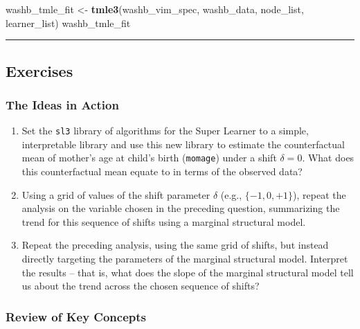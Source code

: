 \documentclass[12pt, krantz2,]{krantz}
\newenvironment{Shaded}{\begin{snugshade}}{\end{snugshade}}
\newcommand{\KeywordTok}[1]{\textcolor[rgb]{0.27,0.27,0.27}{\textbf{#1}}}
\newcommand{\NormalTok}[1]{#1}
\newcommand{\StringTok}[1]{\textcolor[rgb]{0.5,0.5,0.5}{#1}}
\theoremstyle{definition}
\theoremstyle{definition}
\theoremstyle{definition}
\newcommand{\1}{\mathbbm{1}}
\begin{document}
\begin{Shaded}
\begin{Highlighting}[]
\NormalTok{washb_tmle_fit <-}\StringTok{ }\KeywordTok{tmle3}\NormalTok{(washb_vim_spec, washb_data, node_list, learner_list)}
\NormalTok{washb_tmle_fit}
\end{Highlighting}
\end{Shaded}

\begin{center}\rule{0.5\linewidth}{0.5pt}\end{center}

\hypertarget{exercises-3}{%
\subsection{Exercises}\label{exercises-3}}

\hypertarget{the-ideas-in-action-1}{%
\subsubsection{The Ideas in Action}\label{the-ideas-in-action-1}}

\begin{enumerate}
\def\labelenumi{\arabic{enumi}.}
\item
  Set the \texttt{sl3} library of algorithms for the Super Learner to a simple,
  interpretable library and use this new library to estimate the counterfactual
  mean of mother's age at child's birth (\texttt{momage}) under a shift \(\delta = 0\).
  What does this counterfactual mean equate to in terms of the observed data?
\item
  Using a grid of values of the shift parameter \(\delta\) (e.g., \(\{-1, 0, +1\}\)), repeat the analysis on the variable chosen in the preceding question,
  summarizing the trend for this sequence of shifts using a marginal structural
  model.
\item
  Repeat the preceding analysis, using the same grid of shifts, but instead
  directly targeting the parameters of the marginal structural model. Interpret
  the results -- that is, what does the slope of the marginal structural model
  tell us about the trend across the chosen sequence of shifts?
\end{enumerate}

\hypertarget{review-of-key-concepts-2}{%
\subsubsection{Review of Key Concepts}\label{review-of-key-concepts-2}}
\end{document}
